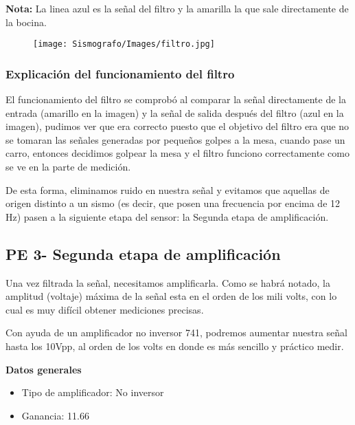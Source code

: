 \documentclass[12pt]{article}
\begin{document}
            \textbf{Nota:} La linea azul es la señal del filtro y la amarilla la que sale directamente de la bocina.
            
	        \begin{figure}[h!]
                \centering
                \texttt{[image: Sismografo/Images/filtro.jpg]}
            \end{figure} 

	        \subsubsection{Explicación del funcionamiento del filtro}
	        El funcionamiento del filtro se comprobó al comparar la señal directamente de la entrada (amarillo en la imagen) y la señal de salida después del filtro (azul en la imagen), pudimos ver que era correcto puesto que el objetivo del filtro era que no se tomaran las señales generadas por pequeños golpes a la mesa, cuando pase un carro, entonces decidimos golpear la mesa y el filtro funciono correctamente como se ve en la parte de medición.
	        
	        De esta forma, eliminamos ruido en nuestra señal y evitamos que aquellas de origen distinto a un sismo (es decir, que posen una frecuencia por encima de 12 Hz) pasen a la siguiente etapa del sensor: la Segunda etapa de amplificación.
	
        \newpage
	    \subsection{PE 3- Segunda etapa de amplificación}
	    
	    Una vez filtrada la señal, necesitamos amplificarla. Como se habrá notado, la amplitud (voltaje) máxima de la señal esta en el orden de los mili volts, con lo cual es muy difícil obtener mediciones precisas. 
	    
	    Con ayuda de un amplificador no inversor 741, podremos aumentar nuestra señal hasta los 10Vpp, al orden de los volts en donde es más sencillo y práctico medir.
	    
	    \textbf{Datos generales}
	        \begin{itemize}
	            \item Tipo de amplificador: No inversor
	            \item Ganancia: 11.66
	        \end{itemize}
\end{document}
